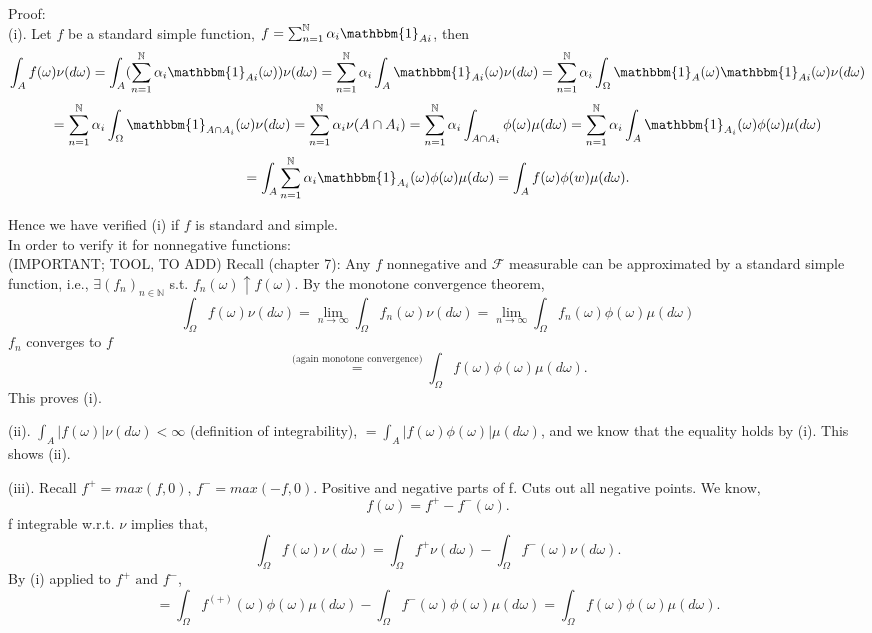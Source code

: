 \begin{exercise}[9.6]
    Proof: \\
    (i). 
    Let $f$ be a standard simple function, 
    $f = \sum_{n=1}^{\mathbb{N}} \alpha_i \mathbbm{1}_{Ai}$, then
    \[
    \int_{A} f(\omega) \nu(d\omega) 
    = \int_{A}  (\sum_{n=1}^{\mathbb{N}} \alpha_i \mathbbm{1}_{Ai}(\omega))\nu(d\omega)
    = \sum_{n=1}^{\mathbb{N}} \alpha_i \int_{A} \mathbbm{1}_{Ai} (\omega)\nu(d\omega) 
    = \sum_{n=1}^{\mathbb{N}} \alpha_i\int_{\Omega} \mathbbm{1}_A(\omega) \mathbbm{1}_{Ai} (\omega) \nu(d\omega) 
    \] 
    \[
    = \sum_{n=1}^{\mathbb{N}} \alpha_i \int_{\Omega} \mathbbm{1}_{A \cap  A_i}(\omega)\nu(d\omega)
    = \sum_{n=1}^{\mathbb{N}} \alpha_i \nu(A \cap  A_i)
    = \sum_{n=1}^{\mathbb{N}} \alpha_i \int_{A \cap  A_i} \phi(\omega) \mu(d\omega)
    = \sum_{n=1}^{\mathbb{N}} \alpha_i \int_{A} \mathbbm{1}_{A_i} (\omega) \phi(\omega) \mu(d\omega)
    \] 
    \[
    = \int_{A} \sum_{n=1}^{\mathbb{N}} \alpha_i \mathbbm{1}_{A_i} (\omega) \phi(\omega) \mu(d\omega)
    = \int_{A} f(\omega) \phi(w) \mu(d\omega)
    .\] 

    Hence we have verified (i) if $f$ is standard and simple. \\
    In order to verify it for nonnegative functions: \\
    (IMPORTANT; TOOL, TO ADD)
    Recall (chapter 7): Any $f$ nonnegative and $\mathcal{F}$ measurable can be approximated by a
    standard simple function, i.e., $\exists (f_n)_{n\in \mathbb{N}}$ s.t. $f_n(\omega) \uparrow f(\omega)$.
    By the monotone convergence theorem,
    \[
    \int_{\Omega} f(\omega)\nu(d\omega)= \lim_{n \to \infty} \int_{\Omega} f_n(\omega)\nu(d\omega)
    = \lim_{n \to \infty} \int_{\Omega} f_n(\omega) \phi(\omega) \mu(d\omega)
    \] 
    $f_n$ converges to $f$
     \[
         \stackrel{\text{(again monotone convergence)}}{=} \int_{\Omega} f(\omega) \phi(\omega) \mu(d\omega)
    .\] 
    This proves (i).

    (ii). 
    $\int_{A} |f(\omega)| \nu(d\omega) < \infty$ (definition of integrability),
    $= \int_{A} |f(\omega) \phi(\omega)| \mu(d\omega)$, and we know that the equality holds by (i).
    This shows (ii).

    (iii). 
    Recall $f^{+} = max(f, 0)$, $f^{-} = max(-f, 0)$.
    Positive and negative parts of f. Cuts out all negative points. We know,
    \[
    f(\omega) = f^{+} - f^{-}(\omega)
    .\] 
    f integrable w.r.t. $ \nu$ implies that,
    \[
    \int_{\Omega} f(\omega)\nu(d\omega) = \int_{\Omega} f^{+}\nu(d\omega) - \int_{\Omega} f^{-}(\omega)\nu(d\omega)
    .\] 
    By (i) applied to $f^{+} \text{ and } f^{-}$,
    \[
    = \int_{\Omega} f^{(+)}(\omega) \phi(\omega)\mu(d\omega) - \int_{\Omega} f^{-}(\omega) \phi(\omega) \mu(d\omega)
    = \int_{\Omega} f(\omega) \phi(\omega) \mu(d\omega)
    .\] 
\end{exercise}

